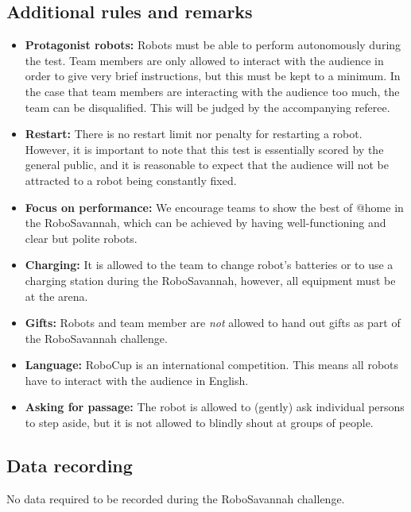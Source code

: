 \subsection{Additional rules and remarks}
\begin{itemize}
\item \textbf{Protagonist robots:} Robots must be able to perform autonomously during the test. 
  Team members are only allowed to interact with the audience in order to give very brief instructions, but this must be kept to a minimum.
  In the case that team members are interacting with the audience too much, the team can be disqualified. 
  This will be judged by the accompanying referee.

\item \textbf{Restart:} There is no restart limit nor penalty for restarting a robot. 
  However, it is important to note that this test is essentially scored by the general public, and it is reasonable to expect that the audience will not be attracted to a robot being constantly fixed. 

\item \textbf{Focus on performance:} We encourage teams to show the best of @home in the RoboSavannah, which can be achieved by having well-functioning and clear but polite robots.

\item \textbf{Charging:} It is allowed to the team to change robot's batteries or to use a charging station during the RoboSavannah, however, all equipment must be at the arena.

\item \textbf{Gifts:} Robots and team member are \emph{not} allowed to hand out gifts as part of the RoboSavannah challenge. 

\item \textbf{Language:} RoboCup is an international competition. This means all robots have to interact with the audience in English.

\item \textbf{Asking for passage:} The robot is allowed to (gently) ask individual persons to step aside, but it is not allowed to blindly shout at groups of people.
\end{itemize}

\subsection{Data recording}
No data required to be recorded during the RoboSavannah challenge.

